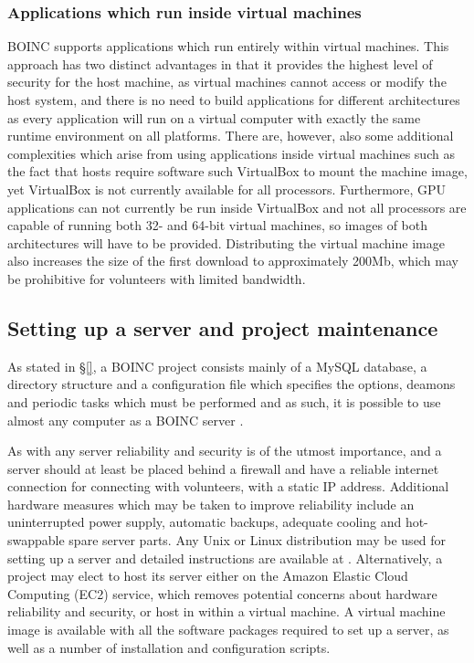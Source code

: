 \subsubsection{Applications which run inside virtual machines} \label{Bvmach}
BOINC supports applications which run entirely within virtual machines. This approach has two distinct advantages in that it provides the highest level of security for the host machine, as virtual machines cannot access or modify the host system, and there is no need to build applications for different architectures as every application will run on a virtual computer with exactly the same runtime environment on all platforms.  
There are, however, also some additional complexities which arise from using applications inside virtual machines such as the fact  that hosts require software such VirtualBox to mount the machine image, yet VirtualBox  is not currently available for all processors. Furthermore, GPU applications can not currently be run inside VirtualBox and not all processors are capable of running both 32- and 64-bit virtual machines, so images of both architectures will have to be provided. Distributing the virtual machine image also increases the size of the first download to approximately 200Mb, which may be prohibitive for volunteers with limited bandwidth.

\subsection{Setting up a server and project maintenance} \label{Bserver}
As stated in \S \ref{},   a BOINC project consists mainly of a MySQL database, a directory structure and a configuration file which specifies the options, deamons and periodic tasks which must be performed and as such, it is possible to use almost any computer as a  BOINC server \cite{boincwiki}.

As with any server reliability and security is of the utmost importance, and a server should at least be placed behind a firewall and have a reliable internet connection for connecting with volunteers, with a static IP address. Additional hardware measures which may  be taken to improve reliability  include an uninterrupted power supply, automatic backups, adequate cooling and hot-swappable spare server parts. Any Unix or Linux distribution may be used for setting up a server and  detailed instructions are available at \cite{boincwiki}. 
Alternatively, a project may elect to host its server either on the Amazon Elastic Cloud Computing (EC2) service, which removes   potential concerns about hardware reliability and security, or host in within a virtual machine. A virtual machine image is available with all the software packages required to set up a server, as well  as a number of installation and configuration scripts.  

